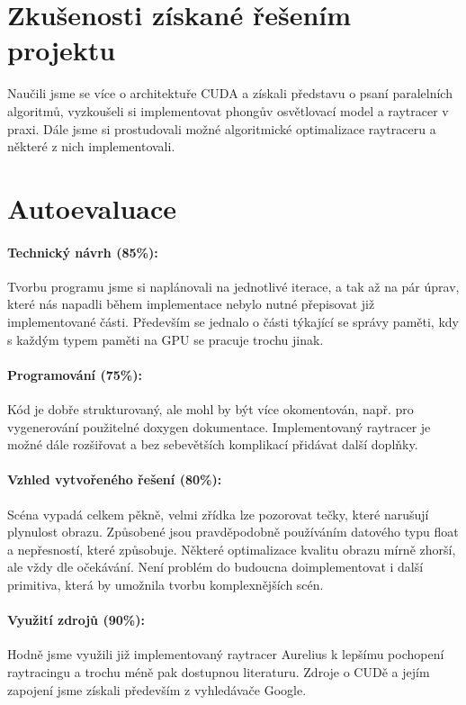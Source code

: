 \documentclass[12pt,a4paper,titlepage,final]{report}
\begin{document}
\section{Zkušenosti získané řešením projektu}

Naučili jsme se více o architektuře CUDA a získali představu o psaní paralelních algoritmů, vyzkoušeli si implementovat phongův osvětlovací model a raytracer v praxi. Dále jsme si prostudovali možné algoritmické optimalizace raytraceru a některé z nich implementovali.

\section{Autoevaluace}

\paragraph{Technický návrh (85\%):} 
Tvorbu programu jsme si naplánovali na jednotlivé iterace, a tak až na pár úprav, které nás napadli během implementace nebylo nutné přepisovat již implementované části. Především se jednalo o části týkající se správy paměti, kdy s každým typem paměti na GPU se pracuje trochu jinak.

\paragraph{Programování (75\%):}
Kód je dobře strukturovaný, ale mohl by být více okomentován, např. pro vygenerování použitelné doxygen dokumentace. 
Implementovaný raytracer je možné dále rozšiřovat a bez sebevětších komplikací přidávat další doplňky.

\paragraph{Vzhled vytvořeného řešení (80\%):} 
Scéna vypadá celkem pěkně, velmi zřídka lze pozorovat tečky, které narušují plynulost obrazu. Způsobené jsou pravděpodobně používáním datového typu float a nepřesností, které způsobuje. Některé optimalizace kvalitu obrazu mírně zhorší, ale vždy dle očekávání. Není problém do budoucna doimplementovat i další primitiva, která by umožnila tvorbu komplexnějších scén.

\paragraph{Využití zdrojů (90\%):}
Hodně jsme využili již implementovaný raytracer Aurelius k lepšímu pochopení raytracingu a trochu méně pak dostupnou literaturu. Zdroje o CUDě a jejím zapojení jsme získali především z vyhledávače Google.
\end{document}
